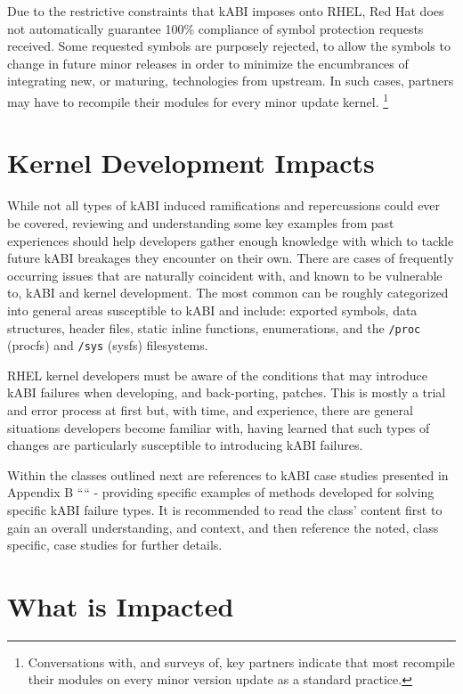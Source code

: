 \documentclass[10pt,oneside,english]{book}
\begin{document}
Due to the restrictive constraints that kABI imposes onto RHEL, Red
Hat does not automatically guarantee 100\% compliance of symbol protection
requests received. Some requested symbols are purposely rejected,
to allow the symbols to change in future minor releases in order to
minimize the encumbrances of integrating new, or maturing, technologies
from upstream. In such cases, partners may have to recompile their
modules for every minor update kernel. \footnote{Conversations with, and surveys of, key partners indicate that most
recompile their modules on every minor version update as a standard
practice.}

\section{Kernel Development Impacts}

While not all types of kABI induced ramifications and repercussions
could ever be covered, reviewing and understanding some key examples
from past experiences should help developers gather enough knowledge
with which to tackle future kABI breakages they encounter on their
own. There are cases of frequently occurring issues that are naturally
coincident with, and known to be vulnerable to, kABI and kernel development.
The most common can be roughly categorized into general areas susceptible
to kABI and include: exported symbols, data structures, header files,
static inline functions, enumerations, and the \texttt{/proc} (procfs)
and \texttt{/sys} (sysfs) filesystems.

RHEL kernel developers must be aware of the conditions that may introduce
kABI failures when developing, and back-porting, patches. This is
mostly a trial and error process at first but, with time, and experience,
there are general situations developers become familiar with, having
learned that such types of changes are particularly susceptible to
introducing kABI failures.

Within the classes outlined next are references to kABI case studies
presented in Appendix B ```` -
providing specific examples of methods developed for solving specific
kABI failure types. It is recommended to read the class' content first
to gain an overall understanding, and context, and then reference
the noted, class specific, case studies for further details.

\section{What is Impacted}
\end{document}
